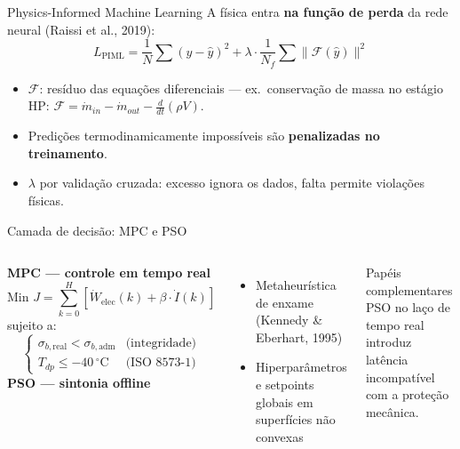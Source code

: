 \documentclass[aspectratio=169,12pt]{beamer}
\begin{document}
\begin{frame}{Physics-Informed Machine Learning}
	A física entra \textbf{na função de perda} da rede neural (Raissi et al., 2019):
	\begin{equation*}
		L_{\text{PIML}} = \frac{1}{N}\sum (y - \hat{y})^2 + \lambda \cdot \frac{1}{N_f}\sum \| \mathcal{F}(\hat{y}) \|^2
	\end{equation*}
	\begin{itemize}
		\item $\mathcal{F}$: resíduo das equações diferenciais — ex.\ conservação de massa no estágio HP: $\mathcal{F} = \dot{m}_{in} - \dot{m}_{out} - \frac{d}{dt}(\rho V)$.
		\item Predições termodinamicamente impossíveis são \textbf{penalizadas no treinamento}.
		\item $\lambda$ por validação cruzada: excesso ignora os dados, falta permite violações físicas.
	\end{itemize}
\end{frame}

\begin{frame}{Camada de decisão: MPC e PSO}
	\begin{columns}[T]
		\textbf{MPC — controle em tempo real}
		\begin{equation*}
			\text{Min } J = \sum_{k=0}^{H} \left[ \dot{W}_{\text{elec}}(k) + \beta \cdot \dot{I}(k) \right]
		\end{equation*}
		sujeito a:
		\begin{equation*}
			\begin{cases} \sigma_{b,\text{real}} < \sigma_{b,\text{adm}} & \text{(integridade)} \\ T_{dp} \le -40\,^{\circ}\text{C} & \text{(ISO 8573-1)} \end{cases}
		\end{equation*}
		\textbf{PSO — sintonia offline}
		\begin{itemize}
			\item Metaheurística de enxame (Kennedy \& Eberhart, 1995)
			\item Hiperparâmetros e setpoints globais em superfícies não convexas
		\end{itemize}
		\begin{alertblock}{Papéis complementares}
			PSO no laço de tempo real introduz latência incompatível com a proteção mecânica.
		\end{alertblock}
	\end{columns}
\end{frame}
\end{document}
